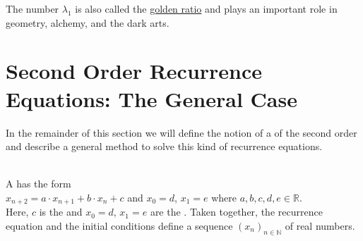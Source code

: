 \remark 
The number $\lambda_1$ is also called the \href{https://en.wikipedia.org/wiki/Golden_ratio}{golden ratio} 
and plays an important role in geometry, alchemy, and the dark arts. \eoxs

\section{Second Order Recurrence Equations: The General Case}
In the remainder of this section we will define the notion of a 
of the second order and describe a general method to solve this kind of recurrence equations.

\begin{Definition} \hspace*{\fill} \\
  A 
  has the form
  \\[0.2cm]
  \hspace*{1.3cm}
  $x_{n+2} = a \cdot x_{n+1} + b \cdot x_n + c$ \quad and \quad $x_0 = d$, $x_1 = e$
  \quad where $a, b, c, d, e \in \mathbb{R}$.
  \\[0.2cm]
  Here, $c$ is the  and $x_0 = d$, $x_1 = e$ are the .  Taken together, the recurrence
  equation and the initial conditions define a sequence $(x_n)_{n\in\mathbb{N}}$ of real numbers.  \eox
\end{Definition}

